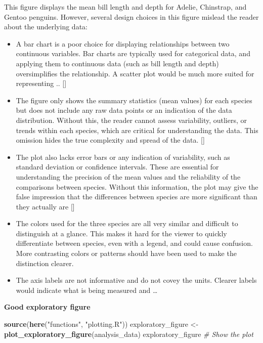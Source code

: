 \documentclass[
]{article}
\newenvironment{Shaded}{\begin{snugshade}}{\end{snugshade}}
\newcommand{\CommentTok}[1]{\textcolor[rgb]{0.56,0.35,0.01}{\textit{#1}}}
\newcommand{\FunctionTok}[1]{\textcolor[rgb]{0.13,0.29,0.53}{\textbf{#1}}}
\newcommand{\NormalTok}[1]{#1}
\newcommand{\OtherTok}[1]{\textcolor[rgb]{0.56,0.35,0.01}{#1}}
\newcommand{\StringTok}[1]{\textcolor[rgb]{0.31,0.60,0.02}{#1}}
\begin{document}
This figure displays the mean bill length and depth for Adelie,
Chinstrap, and Gentoo penguins. However, several design choices in this
figure mislead the reader about the underlying data:

\begin{itemize}
\item
  A bar chart is a poor choice for displaying relationships between two
  continuous variables. Bar charts are typically used for categorical
  data, and applying them to continuous data (such as bill length and
  depth) oversimplifies the relationship. A scatter plot would be much
  more suited for representing .. {[}{]}
\item
  The figure only shows the summary statistics (mean values) for each
  species but does not include any raw data points or an indication of
  the data distribution. Without this, the reader cannot assess
  variability, outliers, or trends within each species, which are
  critical for understanding the data. This omission hides the true
  complexity and spread of the data. {[}{]}
\item
  The plot also lacks error bars or any indication of variability, such
  as standard deviation or confidence intervals. These are essential for
  understanding the precision of the mean values and the reliability of
  the comparisons between species. Without this information, the plot
  may give the false impression that the differences between species are
  more significant than they actually are {[}{]}
\item
  The colors used for the three species are all very similar and
  difficult to distinguish at a glance. This makes it hard for the
  viewer to quickly differentiate between species, even with a legend,
  and could cause confusion. More contrasting colors or patterns should
  have been used to make the distinction clearer.
\item
  The axis labels are not informative and do not covey the units.
  Clearer labels would indicate what is being measured and \ldots{}
\end{itemize}

\textbf{Good exploratory figure}

\begin{Shaded}
\begin{Highlighting}[]
\FunctionTok{source}\NormalTok{(}\FunctionTok{here}\NormalTok{(}\StringTok{"functions"}\NormalTok{, }\StringTok{"plotting.R"}\NormalTok{))}
\NormalTok{exploratory\_figure }\OtherTok{\textless{}{-}} \FunctionTok{plot\_exploratory\_figure}\NormalTok{(analysis\_data)}
\NormalTok{exploratory\_figure }\CommentTok{\# Show the plot}
\end{Highlighting}
\end{Shaded}
\end{document}
